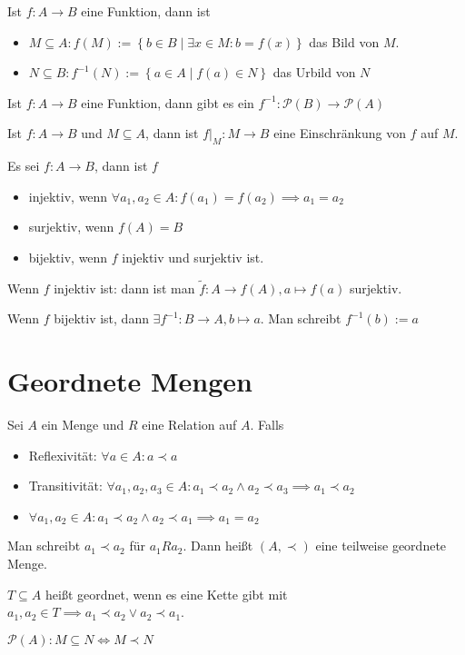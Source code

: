 \begin{definition}
  Ist $f: A \to B$ eine Funktion, dann ist
  \begin{itemize}
  \item $M \subseteq A: f(M) := \left\{ b \in B \middle| \exists x \in M: b = f(x) \right\}$ das Bild von $M$.
  \item $N \subseteq B: f^{-1}(N) := \left\{ a \in A \middle| f(a) \in N \right\}$ das Urbild von $N$
  \end{itemize}

  Ist $f: A \to B$ eine Funktion, dann gibt es ein $f^{-1}: \mathscr{P}(B) \to \mathscr{P}(A)$

  Ist $f: A \to B$ und $M \subseteq A$, dann ist $f|_M: M \to B$ eine Einschränkung von $f$ auf $M$.
\end{definition}

\begin{definition}
  Es sei $f: A \to B$, dann ist $f$
  \begin{itemize}
  \item injektiv, wenn $\forall a_1, a_2 \in A: f(a_1) = f(a_2) \implies a_1 = a_2$
  \item surjektiv, wenn $f(A) = B$
  \item bijektiv, wenn $f$ injektiv und surjektiv ist.
  \end{itemize}

  Wenn $f$ injektiv ist: dann ist man $\tilde{f}: A \to f(A), a \mapsto f(a)$ surjektiv.

  Wenn $f$ bijektiv ist, dann $\exists f^{-1}: B \to A, b \mapsto a$. Man schreibt $f^{-1}(b) := a$
\end{definition}

\section{Geordnete Mengen}
\begin{definition}
  Sei $A$ ein Menge und $R$ eine Relation auf $A$. Falls
  \begin{itemize}
  \item Reflexivität: $\forall a \in A: a \prec a$
  \item Transitivität: $\forall a_1, a_2, a_3 \in A: a_1 \prec a_2 \wedge a_2 \prec a_3 \implies a_1 \prec a_2$
  \item $\forall a_1, a_2 \in A: a_1 \prec a_2 \wedge a_2 \prec a_1 \implies a_1 = a_2$
  \end{itemize}

  Man schreibt $a_1 \prec a_2$ für $a_1 R a_2$. Dann heißt $(A, \prec)$ eine teilweise geordnete Menge.

  $T \subseteq A$ heißt geordnet, wenn es eine Kette gibt mit $a_1, a_2 \in T \implies a_1 \prec a_2 \vee a_2 \prec a_1$.
\end{definition}
\begin{example}
  $\mathscr{P}(A): M \subseteq N \iff M \prec N$
\end{example}